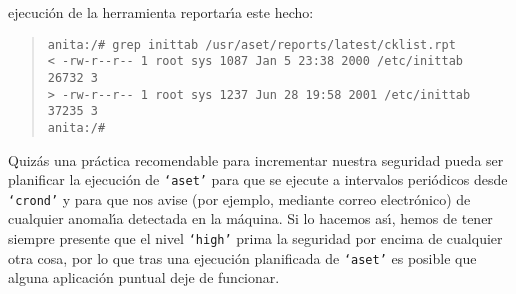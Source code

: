 ejecuci\'on de la herramienta reportar\'{\i}a este hecho:
\begin{quote}
\begin{verbatim}
anita:/# grep inittab /usr/aset/reports/latest/cklist.rpt 
< -rw-r--r-- 1 root sys 1087 Jan 5 23:38 2000 /etc/inittab  26732 3
> -rw-r--r-- 1 root sys 1237 Jun 28 19:58 2001 /etc/inittab  37235 3
anita:/# 
\end{verbatim}
\end{quote}
Quiz\'as una pr\'actica recomendable para incrementar nuestra seguridad pueda
ser planificar la ejecuci\'on de {\tt `aset'} para que se ejecute a 
intervalos peri\'odicos desde {\tt `crond'} y para que nos avise (por ejemplo,
mediante correo electr\'onico) de cualquier anomal\'{\i}a detectada en la 
m\'aquina. Si lo hacemos as\'{\i}, hemos de tener siempre presente que el nivel
{\tt `high'} prima la seguridad por encima de cualquier otra cosa, por lo que
tras una ejecuci\'on planificada de {\tt `aset'} es posible que alguna 
aplicaci\'on puntual deje de funcionar.
